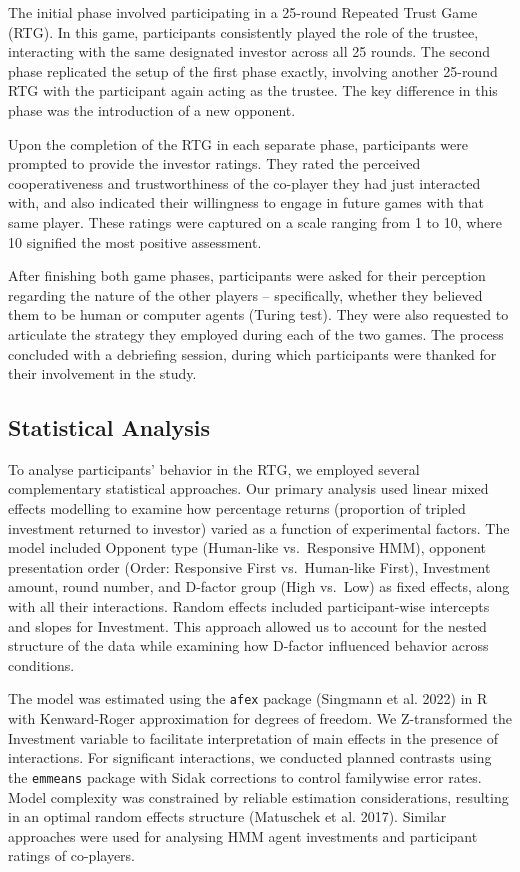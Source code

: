 \documentclass[
]{article}
\begin{document}
The initial phase involved participating in a 25-round Repeated Trust Game (RTG). In this game, participants consistently played the role of the trustee, interacting with the same designated investor across all 25 rounds. The second phase replicated the setup of the first phase exactly, involving another 25-round RTG with the participant again acting as the trustee. The key difference in this phase was the introduction of a new opponent.

Upon the completion of the RTG in each separate phase, participants were prompted to provide the investor ratings. They rated the perceived cooperativeness and trustworthiness of the co-player they had just interacted with, and also indicated their willingness to engage in future games with that same player. These ratings were captured on a scale ranging from 1 to 10, where 10 signified the most positive assessment.

After finishing both game phases, participants were asked for their perception regarding the nature of the other players -- specifically, whether they believed them to be human or computer agents (Turing test). They were also requested to articulate the strategy they employed during each of the two games. The process concluded with a debriefing session, during which participants were thanked for their involvement in the study.

\subsection{Statistical Analysis}\label{statistical-analysis}

To analyse participants' behavior in the RTG, we employed several complementary statistical approaches. Our primary analysis used linear mixed effects modelling to examine how percentage returns (proportion of tripled investment returned to investor) varied as a function of experimental factors. The model included Opponent type (Human-like vs.~Responsive HMM), opponent presentation order (Order: Responsive First vs.~Human-like First), Investment amount, round number, and D-factor group (High vs.~Low) as fixed effects, along with all their interactions. Random effects included participant-wise intercepts and slopes for Investment. This approach allowed us to account for the nested structure of the data while examining how D-factor influenced behavior across conditions.

The model was estimated using the \texttt{afex} package (Singmann et al. 2022) in R with Kenward-Roger approximation for degrees of freedom. We Z-transformed the Investment variable to facilitate interpretation of main effects in the presence of interactions. For significant interactions, we conducted planned contrasts using the \texttt{emmeans} package with Sidak corrections to control familywise error rates. Model complexity was constrained by reliable estimation considerations, resulting in an optimal random effects structure (Matuschek et al. 2017). Similar approaches were used for analysing HMM agent investments and participant ratings of co-players.
\end{document}

